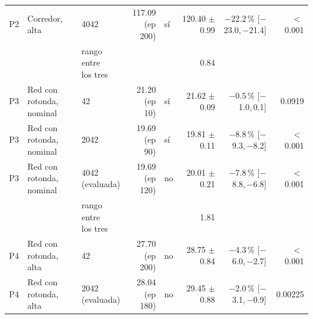 \begin{table}[H]
\begin{tabular}{lllrlrrr}
P2 & \makecell[l]{Corredor,\\{}alta} & 4042 & \makecell[r]{117.09\\{}(ep 200)} & sí & \makecell[r]{120.40\\{}$\pm$ 0.99} & \makecell[r]{$-$22.2\,\%\\{}[$-$23.0,\,$-$21.4]} & $<$\,0.001 \\
 & & \makecell[l]{rango entre\\{}los tres} & & & 0.84 & & \\
P3 & \makecell[l]{Red con rotonda,\\{}nominal} & 42 & \makecell[r]{21.20\\{}(ep 10)} & sí & \makecell[r]{21.62\\{}$\pm$ 0.09} & \makecell[r]{$-$0.5\,\%\\{}[$-$1.0,\,0.1]} & 0.0919 \\
P3 & \makecell[l]{Red con rotonda,\\{}nominal} & 2042 & \makecell[r]{19.69\\{}(ep 90)} & sí & \makecell[r]{19.81\\{}$\pm$ 0.11} & \makecell[r]{$-$8.8\,\%\\{}[$-$9.3,\,$-$8.2]} & $<$\,0.001 \\
P3 & \makecell[l]{Red con rotonda,\\{}nominal} & \makecell[l]{4042\\{}(evaluada)} & \makecell[r]{19.69\\{}(ep 120)} & no & \makecell[r]{20.01\\{}$\pm$ 0.21} & \makecell[r]{$-$7.8\,\%\\{}[$-$8.8,\,$-$6.8]} & $<$\,0.001 \\
 & & \makecell[l]{rango entre\\{}los tres} & & & 1.81 & & \\
P4 & \makecell[l]{Red con rotonda,\\{}alta} & 42 & \makecell[r]{27.70\\{}(ep 200)} & no & \makecell[r]{28.75\\{}$\pm$ 0.84} & \makecell[r]{$-$4.3\,\%\\{}[$-$6.0,\,$-$2.7]} & $<$\,0.001 \\
P4 & \makecell[l]{Red con rotonda,\\{}alta} & \makecell[l]{2042\\{}(evaluada)} & \makecell[r]{28.04\\{}(ep 180)} & no & \makecell[r]{29.45\\{}$\pm$ 0.88} & \makecell[r]{$-$2.0\,\%\\{}[$-$3.1,\,$-$0.9]} & 0.00225 \\

\end{tabular}
\end{table}
